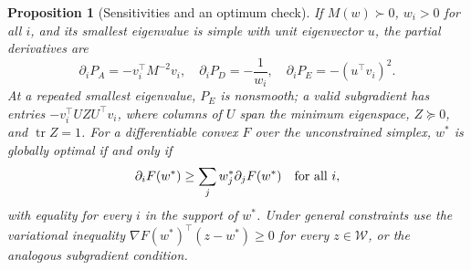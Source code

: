 \documentclass[11pt]{article}
\newcommand{\tr}{\operatorname{tr}}
\newtheorem{proposition}{Proposition}
\begin{document}
\begin{proposition}[Sensitivities and an optimum check]\label{prop:gradient}
If $M(w)\succ0$, $w_i>0$ for all $i$, and its smallest eigenvalue is simple with unit eigenvector $u$, the partial derivatives are
\begin{equation}\label{eq:gradients}
\partial_iP_A=-v_i^\top M^{-2}v_i,\quad
\partial_iP_D=-\frac{1}{w_i},\quad
\partial_iP_E=-(u^\top v_i)^2.
\end{equation}
At a repeated smallest eigenvalue, $P_E$ is nonsmooth; a valid subgradient has entries $-v_i^\top UZU^\top v_i$, where columns of $U$ span the minimum eigenspace, $Z\succeq0$, and $\tr Z=1$. For a differentiable convex $F$ over the unconstrained simplex, $w^*$ is globally optimal if and only if
\begin{equation}\label{eq:equivalence}
 \partial_iF(w^*)\geq \sum_jw_j^*\partial_jF(w^*)\quad\hbox{for all }i,
\end{equation}
with equality for every $i$ in the support of $w^*$. Under general constraints use the variational inequality $\nabla F(w^*)^\top(z-w^*)\geq0$ for every $z\in\mathcal W$, or the analogous subgradient condition.
\end{proposition}
\end{document}
